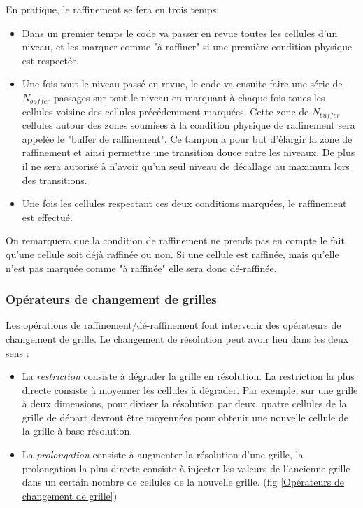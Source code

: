 En pratique, le raffinement se fera en trois temps:

\begin{itemize}
\item Dans un premier temps le code va passer en revue toutes les cellules d'un niveau, et les marquer comme "à raffiner" si une première condition physique est respectée.

\item Une fois tout le niveau passé en revue, le code va ensuite faire une série de $N_{buffer}$ passages sur tout le niveau en marquant à chaque fois toues les cellules voisine des cellules précédemment marquées.
Cette zone de $N_{buffer}$ cellules autour des zones soumises à la condition physique de raffinement sera appelée le "buffer de raffinement".
Ce tampon a pour but d’élargir la zone de raffinement et ainsi permettre une transition douce entre les niveaux.
De plus il ne sera autorisé à n'avoir qu'un seul niveau de décallage au maximum lors des transitions.

\item Une fois les cellules respectant ces deux conditions marquées, le raffinement est effectué.
\end{itemize}


On remarquera que la condition de raffinement ne prends pas en compte le fait qu'une cellule soit déjà raffinée ou non.
Si une cellule est raffinée, mais qu'elle n'est pas marquée comme "à raffinée" elle sera donc dé-raffinée.

\subsubsection{Opérateurs de changement de grilles} 
\label{Opérateurs de changement de grilles}

Les opérations de raffinement/dé-raffinement font intervenir des opérateurs de changement de grille.
Le changement de résolution peut avoir lieu dans les deux sens :

\begin{itemize}
\item La \emph{restriction} consiste à dégrader la grille en résolution. 
La restriction la plus directe consiste à moyenner les cellules à dégrader. 
Par exemple, sur une grille à deux dimensions, pour diviser la résolution par deux, quatre cellules de la grille de départ devront être moyennées pour obtenir une nouvelle cellule de la grille à base résolution.

\item La \emph{prolongation} consiste à augmenter la résolution d'une grille, la prolongation la plus directe consiste à injecter les valeurs de l'ancienne grille dans un certain nombre de cellules de la nouvelle grille. (fig \ref{Opérateurs de changement de grille})
\end{itemize}

